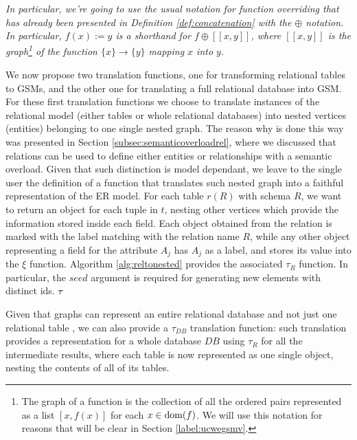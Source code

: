 \textit{In particular, we're going to use the usual notation for function overriding \cite{Nielson05} that has already been presented in Definition \vref{def:concatenation} with the $\oplus$ notation. In particular, $f(x):=y$ is a shorthand for $f\oplus [[x, y]]$, where $[[x, y]]$ is the  graph\footnote{The graph of a function is the collection of all the ordered pairs represented as a list $[x,f(x)]$ for each $x\in\operatorname{dom}(f)$. We will use this notation for reasons that will be clear in Section \vref{label:ucwegsmv}.} of the function $\{x\}\to \{y\}$ mapping $x$ into $y$.}



We now propose two translation functions, one for transforming relational tables to GSMs, and the other one for translating a full relational database into GSM. For these first translation functions we choose to translate instances of the relational model (either tables or whole relational databases) into nested vertices (entities) belonging to one single nested graph. The reason why is done this way was presented in Section \vref{subsec:semanticoverloadrel}, where we discussed that relations can be used to define either entities or relationships with a semantic overload. Given that such distinction is model dependant, we leave to the single user the definition of a function that translates such nested graph into a faithful representation of the ER model. For each table $r(R)$ with schema $R$, we want to return an object for each tuple in $t$, nesting other vertices which provide the information stored inside each field. Each object obtained from the relation is marked with the  label matching with the relation name $R$, while any other object representing a field for the attribute $A_j$ has $A_j$ as a label, and stores its value into the $\xi$ function.  Algorithm \vref{alg:reltonested} provides the associated $\tau_R$ function. In particular, the $seed$ argument is required for generating new elements with distinct ids. $\ttranslIndex{relational to Nested Graphs}$

Given that graphs can represent an entire relational database and
not just one relational table \cite{Fagin83,bergami2014}, we can also provide a $\tau_{DB}$ translation function: such translation provides a representation for a whole database $DB$ using $\tau_R$ for all the intermediate results, where each table is now represented as one single object, nesting the contents of all of its tables.


